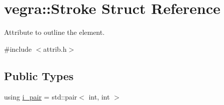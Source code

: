 \hypertarget{structvegra_1_1Stroke}{}\section{vegra\+:\+:Stroke Struct Reference}
\label{structvegra_1_1Stroke}


Attribute to outline the element.  




{\ttfamily \#include $<$attrib.\+h$>$}

\subsection*{Public Types}
\begin{DoxyCompactItemize}
\item 
using \mbox{\hyperlink{structvegra_1_1Stroke_af5a2b4ee71962d044ebb7a309b22bb8a}{i\+\_\+pair}} = std\+::pair$<$ int, int $>$
\end{DoxyCompactItemize}
